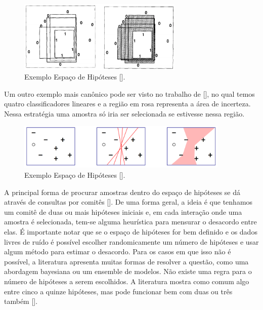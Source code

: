 \begin{figure}
  \centering
  \includegraphics[width=0.7\textwidth]{figures/cohn_1994_hypothesis_space_example.png}
  \caption{Exemplo Espaço de Hipóteses [\cite{cohn1994improving}].}
  \label{fig:cohn_1994_hypothesis_space_example}
\end{figure}

Um outro exemplo mais canônico pode ser visto no trabalho de [\cite{dasgupta2011two}], no qual temos quatro classificadores lineares e a região em rosa representa a área de incerteza. Nessa estratégia uma amostra só iria ser selecionada se estivesse nessa região.

\begin{figure}
  \centering
  \includegraphics[width=0.9\textwidth]{figures/dasgupta_two_faces_hypothesis_example.png}
  \caption{Exemplo Espaço de Hipóteses [\cite{dasgupta2011two}].}
  \label{fig:dasgupta_two_faces_hypothesis_example}
\end{figure}


A principal forma de procurar amostras dentro do espaço de hipóteses se dá através de consultas por comitês [\cite{seung1992query}]. De uma forma geral, a ideia é que tenhamos um comitê de duas ou mais hipóteses iniciais e, em cada interação onde uma amostra é selecionada, tem-se alguma heurística para mensurar o desacordo entre elas. É importante notar que se o espaço de hipóteses for bem definido e os dados livres de ruído é possível escolher randomicamente um número de hipóteses e usar algum método para estimar o desacordo. Para os casos em que isso não é possível, a literatura apresenta muitas formas de resolver a questão, como uma abordagem bayesiana ou um ensemble de modelos. Não existe uma regra para o número de hipóteses a serem escolhidos. A literatura mostra como comum algo entre cinco a quinze hipóteses, mas pode funcionar bem com duas ou três também [\cite{settles2014active}]. 


